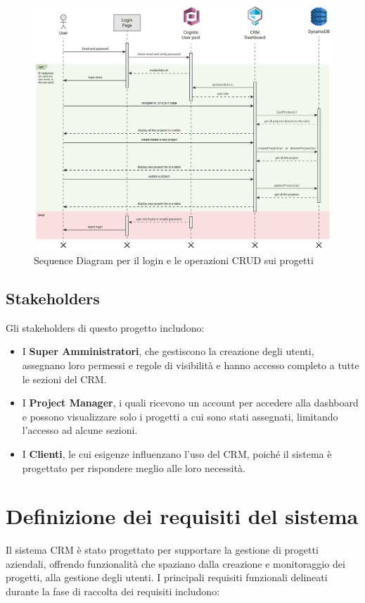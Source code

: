 \documentclass[target=bach,aauheader=,style=]{thud}
\begin{document}
\begin{figure}[H]
    \centering
    \includegraphics[width=1\textwidth]{img/diagrammi/sequence.pdf} 
    \caption{Sequence Diagram per il login e le operazioni CRUD sui progetti}
    \label{diagramma_sequenza}
\end{figure}

\subsection{Stakeholders}
Gli stakeholders di questo progetto includono:

\begin{itemize}
    \item I \textbf{Super Amministratori}, che gestiscono la creazione degli utenti, assegnano loro permessi e regole di visibilità e hanno accesso completo a tutte le sezioni del CRM. 
    \item I \textbf{Project Manager}, i quali ricevono un account per accedere alla dashboard e possono visualizzare solo i progetti a cui sono stati assegnati, limitando l'accesso ad alcune sezioni.
    \item I \textbf{Clienti}, le cui esigenze influenzano l'uso del CRM, poiché il sistema è progettato per rispondere meglio alle loro necessità.
\end{itemize}

\section{Definizione dei requisiti del sistema}
Il sistema CRM è stato progettato per supportare la gestione di progetti aziendali, offrendo funzionalità che spaziano dalla creazione e monitoraggio dei progetti, alla gestione degli utenti. I principali requisiti funzionali delineati durante la fase di raccolta dei requisiti includono:
\end{document}

